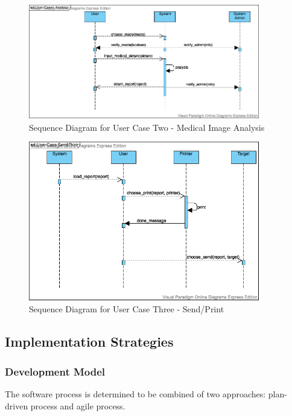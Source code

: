 \documentclass[11pt,bibliography=totocnumbered]{article}
\begin{document}
  \begin{figure}[H]
	\centering
	\includegraphics[width=0.9\textwidth]{figures/image-analysis}
	\caption{Sequence Diagram for User Case Two - Medical Image Analysis}
	\label{fig:image-analysis}
  \end{figure}

  \begin{figure}[H]
  	\centering
  	\includegraphics[width=0.9\textwidth]{figures/send}
  	\caption{Sequence Diagram for User Case Three - Send/Print}
  	\label{fig:send}
  \end{figure}
  
  
  \subsection{Implementation Strategies}
  
  \subsubsection{Development Model}
  
  The software process is determined to be combined of two approaches: plan-driven process and agile process.
  
\end{document}
